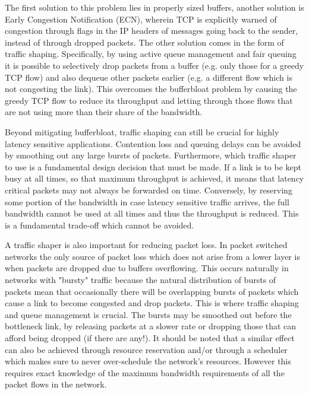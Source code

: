 The first solution to this problem lies in properly sized buffers, another solution is Early Congestion Notification (ECN), wherein TCP is explicitly warned of congestion through flags in the IP headers of messages going back to the sender, instead of through dropped packets. The other solution comes in the form of traffic shaping. Specifically, by using active queue management and fair queuing it is possible to selectively drop packets from a buffer (e.g. only those for a greedy TCP flow) and also dequeue other packets earlier (e.g. a different flow which is not congesting the link). This overcomes the bufferbloat problem by causing the greedy TCP flow to reduce its throughput and letting through those flows that are not using more than their share of the bandwidth.

Beyond mitigating bufferbloat, traffic shaping can still be crucial for highly latency sensitive applications. Contention loss and queuing delays can be avoided by smoothing out any large bursts of packets. Furthermore, which traffic shaper to use is a fundamental design decision that must be made. If a link is to be kept busy at all times, so that maximum throughput is achieved, it means that latency critical packets may not always be forwarded on time. Conversely, by reserving some portion of the bandwidth in case latency sensitive traffic arrives, the full bandwidth cannot be used at all times and thus the throughput is reduced. This is a fundamental trade-off which cannot be avoided.

A traffic shaper is also important for reducing packet loss. In packet switched networks the only source of packet loss which does not arise from a lower layer is when packets are dropped due to buffers overflowing. This occurs naturally in networks with "bursty" traffic because the natural distribution of bursts of packets mean that occasionally there will be overlapping bursts of packets which cause a link to become congested and drop packets. This is where traffic shaping and queue management is crucial. The bursts may be smoothed out before the bottleneck link, by releasing packets at a slower rate or dropping those that can afford being dropped (if there are any!). It should be noted that a similar effect can also be achieved through resource reservation and/or through a scheduler which makes sure to never over-schedule the network's resources. However this requires exact knowledge of the maximum bandwidth requirements of all the packet flows in the network.

